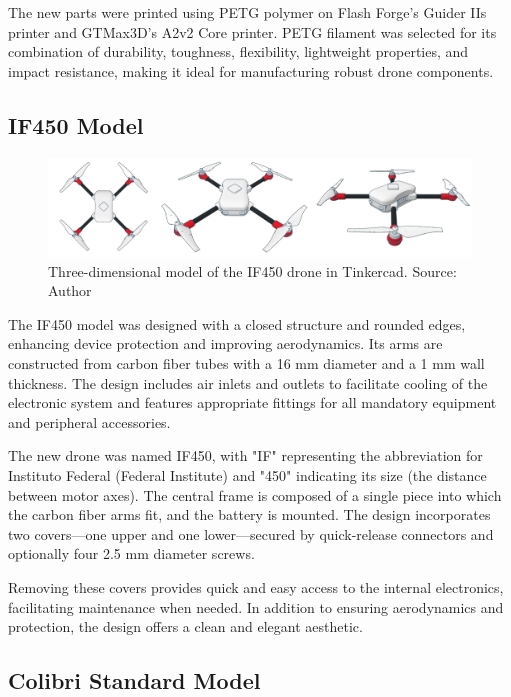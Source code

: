 \documentclass[conference]{IEEEtran}
\begin{document}
The new parts were printed using PETG polymer on Flash Forge’s Guider IIs printer and GTMax3D’s A2v2 Core printer. PETG filament was selected for its combination of durability, toughness, flexibility, lightweight properties, and impact resistance, making it ideal for manufacturing robust drone components.

\subsection{IF450 Model}

\begin{figure}[!htb]
    \centering
    \includegraphics[scale=0.14]{img/IF450.png} 
    \caption{Three-dimensional model of the IF450 drone in Tinkercad. Source: Author}
    \label{fig:my_label}
\end{figure}

The IF450 model was designed with a closed structure and rounded edges, enhancing device protection and improving aerodynamics. Its arms are constructed from carbon fiber tubes with a 16 mm diameter and a 1 mm wall thickness. The design includes air inlets and outlets to facilitate cooling of the electronic system and features appropriate fittings for all mandatory equipment and peripheral accessories.

The new drone was named IF450, with "IF" representing the abbreviation for Instituto Federal (Federal Institute) and "450" indicating its size (the distance between motor axes). The central frame is composed of a single piece into which the carbon fiber arms fit, and the battery is mounted. The design incorporates two covers—one upper and one lower—secured by quick-release connectors and optionally four 2.5 mm diameter screws.

Removing these covers provides quick and easy access to the internal electronics, facilitating maintenance when needed. In addition to ensuring aerodynamics and protection, the design offers a clean and elegant aesthetic.

\subsection{Colibri Standard Model}
\end{document}
